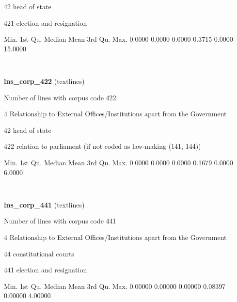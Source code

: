 \documentclass[]{article}
\newenvironment{Shaded}{\begin{snugshade}}{\end{snugshade}}
\newcommand{\FloatTok}[1]{\textcolor[rgb]{0.00,0.00,0.81}{{#1}}}
\newcommand{\NormalTok}[1]{{#1}}
\begin{document}
42 head of state

421 election and resignation

\begin{Shaded}
\begin{Highlighting}[]
   \NormalTok{Min. 1st Qu.  Median    Mean 3rd Qu.    Max. }
 \FloatTok{0.0000}  \FloatTok{0.0000}  \FloatTok{0.0000}  \FloatTok{0.3715}  \FloatTok{0.0000} \FloatTok{15.0000} 
\end{Highlighting}
\end{Shaded}

~

\vspace{1em}

\textbf{lns\_corp\_422} (textlines)

Number of lines with corpus code 422

4 Relationship to External Offices/Institutions apart from the
Government

42 head of state

422 relation to parliament (if not coded as law-making (141, 144))

\begin{Shaded}
\begin{Highlighting}[]
   \NormalTok{Min. 1st Qu.  Median    Mean 3rd Qu.    Max. }
 \FloatTok{0.0000}  \FloatTok{0.0000}  \FloatTok{0.0000}  \FloatTok{0.1679}  \FloatTok{0.0000}  \FloatTok{6.0000} 
\end{Highlighting}
\end{Shaded}

~

\vspace{1em}

\textbf{lns\_corp\_441} (textlines)

Number of lines with corpus code 441

4 Relationship to External Offices/Institutions apart from the
Government

44 constitutional courts

441 election and resignation

\begin{Shaded}
\begin{Highlighting}[]
   \NormalTok{Min. 1st Qu.  Median    Mean 3rd Qu.    Max. }
\FloatTok{0.00000} \FloatTok{0.00000} \FloatTok{0.00000} \FloatTok{0.08397} \FloatTok{0.00000} \FloatTok{4.00000} 
\end{Highlighting}
\end{Shaded}

~
\end{document}
